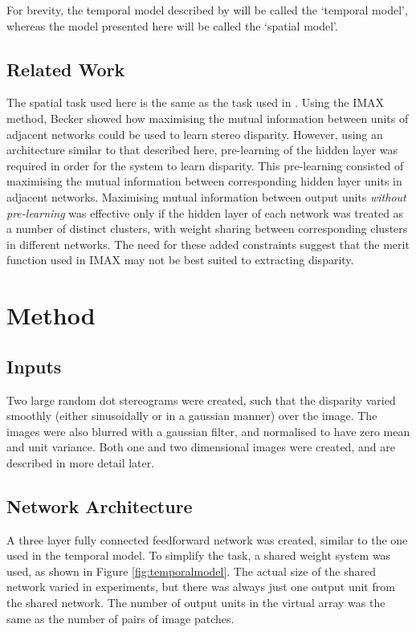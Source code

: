 \documentclass[a4paper]{article}
\begin{document}
For brevity, the temporal model described by \cite{stone95b} will be
called the `temporal model', whereas the model presented here will be
called the `spatial model'.



\subsection{Related Work}

The spatial task used here is the same as the task used in
\cite{beckerthesis}. Using the IMAX method, Becker showed how
maximising the mutual information between units of adjacent networks
could be used to learn stereo disparity. However, using an
architecture similar to that described here, pre-learning of the
hidden layer was required in order for the system to learn disparity.
This pre-learning consisted of maximising the mutual information
between corresponding hidden layer units in adjacent networks.
Maximising mutual information between output units {\em without
  pre-learning} was effective only if the hidden layer of each network
was treated as a number of distinct clusters, with weight sharing
between corresponding clusters in different networks. The need for
these added constraints suggest that the merit function used in IMAX
may not be best suited to extracting disparity.

\section{Method}


\subsection{Inputs}


Two large random dot stereograms were created, such that the disparity
varied smoothly (either sinusoidally or in a gaussian manner) over the
image.  The images were also blurred with a gaussian filter, and
normalised to have zero mean and unit variance.  Both one and two
dimensional images were created, and are described in more detail later.

\subsection{Network Architecture}

A three layer fully connected feedforward network was created, similar to
the one used in the temporal model.  To simplify the task, a shared
weight system was used, as shown in Figure \ref{fig:temporalmodel}.
The actual size of the shared network varied in experiments, but there
was always just one output unit from the shared network.  The number
of output units in the virtual array was the same as the number of
pairs of image patches.
\end{document}
